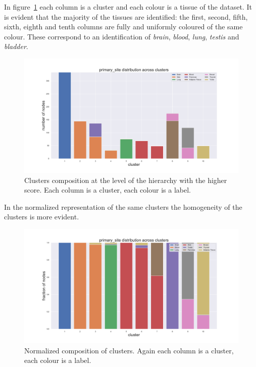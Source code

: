 \clearpage
In figure~\ref{fig:topic/gtex/oversigma_10tissue/clustercomposition_l3_primary_site} each column is a cluster and each colour is a tissue of the dataset. It is evident that the majority of the tissues are identified: the first, second, fifth, sixth, eighth and tenth columns are fully and uniformly coloured of the same colour. These correspond to an identification of \textit{brain}, \textit{blood}, \textit{lung}, \textit{testis} and \textit{bladder}.
\begin{figure}[htb!]
    \centering
    \includegraphics[width=0.9\linewidth]{pictures/topic/gtex/oversigma_10tissue/clustercomposition_l3_primary_site.pdf}
    \caption{Clusters composition at the level of the hierarchy with the higher score. Each column is a cluster, each colour is a label.}
    \label{fig:topic/gtex/oversigma_10tissue/clustercomposition_l3_primary_site}
\end{figure}
In the normalized representation of the same clusters the homogeneity of the clusters is more evident.
\begin{figure}[htb!]
    \centering
    \includegraphics[width=0.9\linewidth]{pictures/topic/gtex/oversigma_10tissue/fraction_clustercomposition_l3_primary_site.pdf}
    \caption{Normalized composition of clusters. Again each column is a cluster, each colour is a label.}
    \label{fig:topic/gtex/oversigma_10tissue/fraction_clustercomposition_l3_primary_site}
\end{figure}
